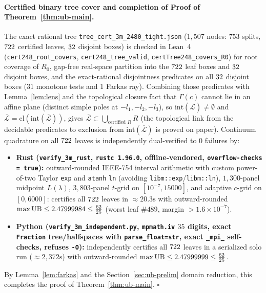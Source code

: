 \paragraph{Certified binary tree cover and completion of Proof of Theorem~\ref{thm:ub-main}.}
The exact rational tree \texttt{tree\_cert\_3m\_2480\_tight.json} ($1{,}507$ nodes: $753$ splits, $722$ certified leaves, $32$ disjoint boxes) is checked in Lean~4 (\texttt{cert248\_root\_covers}, \texttt{cert248\_tree\_valid}, \texttt{certTree248\_covers\_R0}) for root coverage of $R_0$, gap-free real-space partition into the $722$ leaf boxes and $32$ disjoint boxes, and the exact-rational disjointness predicates on all $32$ disjoint boxes ($31$ monotone tests and $1$ Farkas ray). Combining those predicates with Lemma~\ref{lem:lens} and the topological closure fact that $\Gamma(c)$ cannot lie in an affine plane (distinct simple poles at $-l_1,-l_2,-l_3$), so $\mathrm{int}(\overline{\mathcal{L}}) \neq \emptyset$ and $\overline{\mathcal{L}} = \mathrm{cl}(\mathrm{int}(\overline{\mathcal{L}}))$, gives $\overline{\mathcal{L}} \subset \bigcup_{\text{certified } R} R$ (the topological link from the decidable predicates to exclusion from $\mathrm{int}(\overline{\mathcal{L}})$ is proved on paper). Continuum quadrature on all $722$ leaves is independently dual-verified to $0$ failures by:
\begin{itemize}
  \item \textbf{Rust (\texttt{verify\_3m\_rust}, \texttt{rustc 1.96.0}, offline-vendored, \texttt{overflow-checks = true}):} outward-rounded IEEE-754 interval arithmetic with custom power-of-two Taylor \texttt{exp} and \texttt{atanh} \texttt{ln} (avoiding \texttt{libm::exp}/\texttt{libm::ln}), $1{,}300$-panel midpoint $L(\lambda)$, $3{,}803$-panel $t$-grid on $[10^{-7}, 15000]$, and adaptive $c$-grid on $[0, 6000]$: certifies all $722$ leaves in $\approx 20.3\text{s}$ with outward-rounded $\max\text{UB} \le 2.47999984 \le \frac{62}{25}$ (worst leaf $\#489$, margin $> 1.6 \times 10^{-7}$).
  \item \textbf{Python (\texttt{verify\_3m\_independent.py}, \texttt{mpmath.iv} $35$ digits, exact \texttt{Fraction} tree/halfspaces with \texttt{parse\_float=str}, exact \texttt{\_mpi\_} self-checks, refuses \texttt{-O}):} independently certifies all $722$ leaves in a serialized solo run ($\approx 2{,}372\text{s}$) with outward-rounded $\max\text{UB} \le 2.47999999 \le \frac{62}{25}$.
\end{itemize}
By Lemma~\ref{lem:farkas} and the Section~\ref{sec:ub-prelim} domain reduction, this completes the proof of Theorem~\ref{thm:ub-main}. \hfill$\square$

